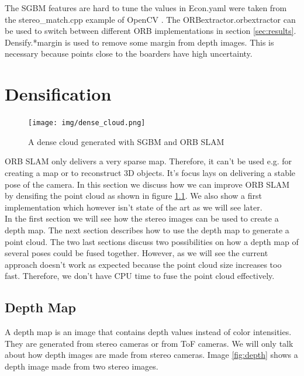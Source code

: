 \documentclass[11pt,a4paper,titlepage,oneside]{report}
\begin{document}
The SGBM features are hard to tune the values in Econ.yaml were taken from the stereo\_match.cpp example of OpenCV \cite{opencv_se}. The ORBextractor.orbextractor can be used to switch between different ORB implementations in section \ref{sec:results}. Densify.*margin is used to remove some margin from depth images. This is necessary because points close to the boarders have high uncertainty.

\chapter{Densification}

\begin{figure}[H]
  \begin{center}
		\texttt{[image: img/dense\_cloud.png]}
  \end{center}
	\caption{A dense cloud generated with SGBM and ORB SLAM}\label{fig:dense_cloud}
\end{figure}

ORB SLAM only delivers a very sparse map. Therefore, it can't be used e.g. for creating a map or to reconstruct 3D objects. It's focus lays on delivering a stable pose of the camera. In this section we discuss how we can improve ORB SLAM by densifing the point cloud as shown in figure \ref{fig:dense_cloud}. We also show a first implementation which however isn't state of the art as we will see later.\\
In the first section we will see how the stereo images can be used to create a depth map. The next section describes how to use the depth map to generate a point cloud. The two last sections discuss two possibilities on how a depth map of several poses could be fused together. However, as we will see the current approach doesn't work as expected because the point cloud size increases too fast. Therefore, we don't have CPU time to fuse the point cloud effectively.

\section{Depth Map}

A depth map is an image that contains depth values instead of color intensities. They are generated from stereo cameras or from ToF cameras. We will only talk about how depth images are made from stereo cameras. Image \ref{fig:depth} shows a depth image made from two stereo images.
\end{document}
